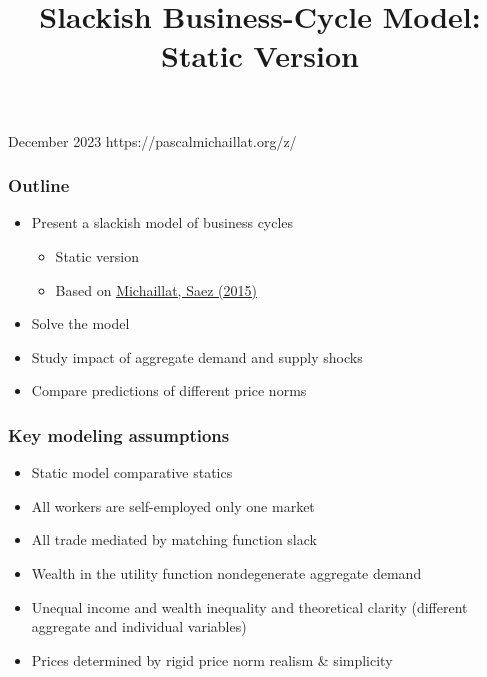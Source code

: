 \documentclass[11pt,aspectratio=169,xcolor={dvipsnames},hyperref={pdftex,pdfpagemode=UseNone,hidelinks,pdfdisplaydoctitle=true},usepdftitle=false]{beamer}
\begin{document}
\title{Slackish Business-Cycle Model: Static Version}
%
{December 2023}%
{https://pascalmichaillat.org/z/}
\frame{\titlepage}

\begin{frame}
\frametitle{Outline}
\begin{itemize}
\item Present a slackish model of business cycles
\begin{itemize}
\item Static version
\item Based on \href{https://pascalmichaillat.org/3/}{Michaillat, Saez (2015)}
\end{itemize}
\item Solve the model
\item Study impact of aggregate demand and supply shocks
\item Compare predictions of different price norms
\end{itemize}	
\end{frame}

\begin{frame}
\frametitle{Key modeling assumptions}
\begin{itemize}
	\item Static model \then comparative statics
	\item All workers are self-employed \then only one market
	\item All trade mediated by matching function \then slack
	\item Wealth in the utility function \then nondegenerate aggregate demand
	\item Unequal income and wealth \then inequality and theoretical clarity (different aggregate and individual variables)
	\item Prices determined by rigid price norm \then realism \& simplicity
\end{itemize}
\end{frame}

\begin{frame}
\end{frame}
\end{document}
